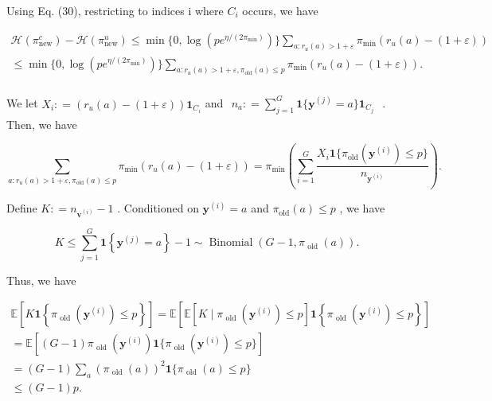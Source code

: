 \documentclass[
  10
]{article}
\begin{document}
Using Eq. (30), restricting to indices i where \(C _ { i }\) occurs, we
have

\[
\begin{array}{l} \mathcal {H} (\pi_ {\mathrm{new}} ^ {c}) - \mathcal {H} (\pi_ {\mathrm{new}} ^ {u}) \leq \min \{0, \log (p e ^ {\eta / (2 \pi_ {\mathrm{min}})}) \} \sum_ {a: r _ {u} (a) > 1 + \varepsilon} \pi_ {\mathrm{min}} (r _ {u} (a) - (1 + \varepsilon)) \\ \leq \min \{0, \log (p e ^ {\eta / (2 \pi_ {\min})}) \} \sum_ {a: r _ {u} (a) > 1 + \varepsilon , \pi_ {\text {old}} (a) \leq p} \pi_ {\min} (r _ {u} (a) - (1 + \varepsilon)). \\ \end{array}
\]

We let
\(X _ { i } : = ( r _ { u } ( a ) - ( 1 + \varepsilon ) ) \mathbf { 1 } _ { C _ { i } }\)
and
\(\begin{array} { r } { n _ { a } : = \sum _ { j = 1 } ^ { G } \mathbf { 1 } \{ \mathbf { y } ^ { ( j ) } = a \} \mathbf { 1 } _ { C _ { j } } } \end{array}\)
. Then, we have

\[
\sum_ {a: r _ {u} (a) > 1 + \varepsilon , \pi_ {\mathrm{old}} (a) \leq p} \pi_ {\min} (r _ {u} (a) - (1 + \varepsilon)) = \pi_ {\min} \left(\sum_ {i = 1} ^ {G} \frac {X _ {i} \mathbf {1} \{\pi_ {\mathrm{old}} (\mathbf {y} ^ {(i)}) \leq p \}}{n _ {\mathbf {y} ^ {(i)}}}\right).
\]

Define \(K : = n _ { \mathbf { v } ^ { ( i ) } } - 1\) . Conditioned on
\(\mathbf { y } ^ { ( i ) } = a\) and
\(\pi _ { \mathrm { o l d } } ( a ) \leq p\) , we have

\[
K \leq \sum_ {j = 1} ^ {G} \mathbf {1} \left\{\mathbf {y} ^ {(j)} = a \right\} - 1 \sim \operatorname{Binomial} (G - 1, \pi_ {\text { old }} (a)).
\]

Thus, we have

\[
\begin{array}{l} \mathbb {E} \left[ K \mathbf {1} \left\{\pi_ {\text { old }} (\mathbf {y} ^ {(i)}) \leq p \right\} \right] = \mathbb {E} \left[ \mathbb {E} \left[ K \mid \pi_ {\text { old }} (\mathbf {y} ^ {(i)}) \leq p \right] \mathbf {1} \left\{\pi_ {\text { old }} (\mathbf {y} ^ {(i)}) \leq p \right\} \right] \\ = \mathbb {E} [ (G - 1) \pi_ {\text { old }} (\mathbf {y} ^ {(i)}) \mathbf {1} \{\pi_ {\text { old }} (\mathbf {y} ^ {(i)}) \leq p \} ] \\ = (G - 1) \sum_ {a} (\pi_ {\text { old }} (a)) ^ {2} \mathbf {1} \{\pi_ {\text { old }} (a) \leq p \} \\ \leq (G - 1) p. \\ \end{array}
\]
\end{document}
